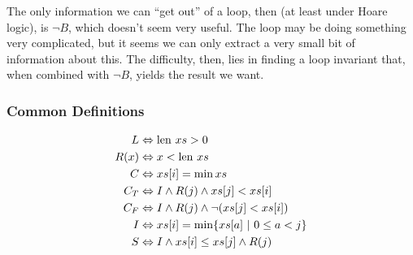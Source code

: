 The only information we can ``get out'' of a loop, then (at least
under Hoare logic), is $\lnot B$, which doesn't seem very useful. The
loop may be doing something very complicated, but it seems we can only
extract a very small bit of information about this. The difficulty,
then, lies in finding a loop invariant that, when combined with $\lnot
B$, yields the result we want.

\begin{lscape}

\begin{prooftree}





\end{prooftree}

\begin{multicols}{3}
\subsubsection{Common Definitions}
\begin{align*}
  L &\iff \len xs > 0\\
  R(x) &\iff x < \len xs\\
  C &\iff xs[i] = \min xs\\
  C_{T}&\iff I \land R(j) \land xs[j] < xs[i]\\
  C_{F}&\iff I \land R(j) \land \lnot(xs[j] < xs[i])\\
  I&\iff xs[i] = \min \{xs[a]~|~0 \leq a < j\}\\
  S&\iff I \land xs[i] \leq xs[j] \land R(j)
\end{align*}
\vfill


\end{multicols}
\end{lscape}
